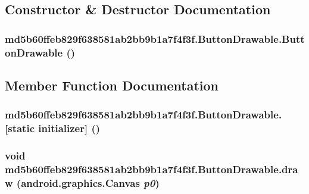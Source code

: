 \subsection{Constructor \& Destructor Documentation}
\hypertarget{classmd5b60ffeb829f638581ab2bb9b1a7f4f3f_1_1_button_drawable_178782ff509c82a2749a13c2d25b574a}{
\subsubsection[{ButtonDrawable}]{\setlength{\rightskip}{0pt plus 5cm}md5b60ffeb829f638581ab2bb9b1a7f4f3f.ButtonDrawable.ButtonDrawable ()}}
\label{classmd5b60ffeb829f638581ab2bb9b1a7f4f3f_1_1_button_drawable_178782ff509c82a2749a13c2d25b574a}




\subsection{Member Function Documentation}
\hypertarget{classmd5b60ffeb829f638581ab2bb9b1a7f4f3f_1_1_button_drawable_997a240c130ec2aeda640089ab2e2f26}{
\subsubsection[{[static initializer]}]{\setlength{\rightskip}{0pt plus 5cm}md5b60ffeb829f638581ab2bb9b1a7f4f3f.ButtonDrawable.\mbox{[}static initializer\mbox{]} ()}}
\label{classmd5b60ffeb829f638581ab2bb9b1a7f4f3f_1_1_button_drawable_997a240c130ec2aeda640089ab2e2f26}


\hypertarget{classmd5b60ffeb829f638581ab2bb9b1a7f4f3f_1_1_button_drawable_bed61f66aa2554190f102b5f1daae539}{
\subsubsection[{draw}]{\setlength{\rightskip}{0pt plus 5cm}void md5b60ffeb829f638581ab2bb9b1a7f4f3f.ButtonDrawable.draw (android.graphics.Canvas {\em p0})}}
\label{classmd5b60ffeb829f638581ab2bb9b1a7f4f3f_1_1_button_drawable_bed61f66aa2554190f102b5f1daae539}


